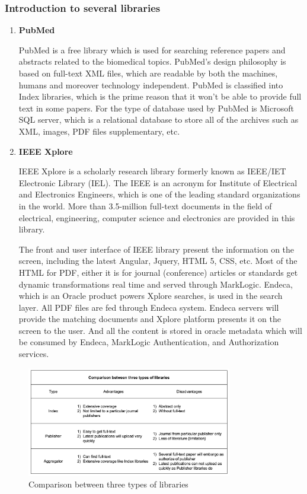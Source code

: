\subsubsection{Introduction to several libraries }
\begin{enumerate}
	\item\textbf{PubMed}
	\setlength{\parindent}{2em}
		
	 PubMed is a free library which is used for searching reference papers and abstracts related to the biomedical topics. PubMed’s design philosophy is based on full-text XML files, which are readable by both the machines, humans and moreover technology independent. PubMed is classified into Index libraries, which is the prime reason that it won’t be able to provide full text in some papers. For the type of database used by PubMed is Microsoft SQL server, which is a relational database to store all of the archives such as XML, images, PDF files supplementary, etc.
	
	
	\item\textbf{IEEE Xplore}
	\setlength{\parindent}{2em}
	
	IEEE Xplore is a scholarly research library formerly known as IEEE/IET Electronic Library (IEL). The IEEE is an acronym for Institute of Electrical and Electronics Engineers, which is one of the leading standard organizations in the world. More than 3.5-million full-text documents in the field of electrical, engineering, computer science and electronics are provided in this library. 
	
	The front and user interface of IEEE library present the information on the screen, including the latest Angular, Jquery, HTML 5, CSS, etc. Most of the HTML for PDF, either it is for journal (conference) articles or standards get dynamic transformations real time and served through MarkLogic. Endeca, which is an Oracle product powers Xplore searches, is used in the search layer. All PDF files are fed through Endeca system. Endeca servers will provide the matching documents and Xplore platform presents it on the screen to the user. And all the content is stored in oracle metadata which will be consumed by Endeca, MarkLogic Authentication, and Authorization services.
	
\end{enumerate}

\begin{figure}[htb]
	\begin{center}
		\includegraphics[width=0.8\textwidth]{Wolverine_Background_Chart_1}
	\end{center}
	\caption{Comparison between three types of libraries}
\end{figure}
\newpage
